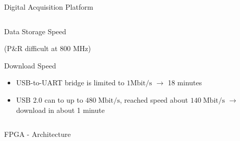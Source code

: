 \documentclass[10pt]{beamer}
\begin{document}
\begin{frame}{Digital Acquisition Platform}
\begin{columns}[T]
\begin{column}{.5\textwidth}
\begin{block}{Data Storage Speed}
\begin{itemize}
          (P\&R difficult at 800 MHz)
        \end{itemize}
      \end{block}
      \begin{block}{Download Speed}
        \begin{itemize}
        \item USB-to-UART bridge is limited to $1 \text{Mbit}/\text{s}$
          $\rightarrow$ 18 minutes
        \item USB 2.0 can to up to $480 \;\text{Mbit}/\text{s}$, reached speed
          about $140 \;\text{Mbit}/\text{s}$ $\rightarrow$ download in about 1 minute
        \end{itemize}
      \end{block}
    \end{column}
  \end{columns}
\end{frame}

\begin{frame}{FPGA - Architecture}
\end{frame}
\end{document}
